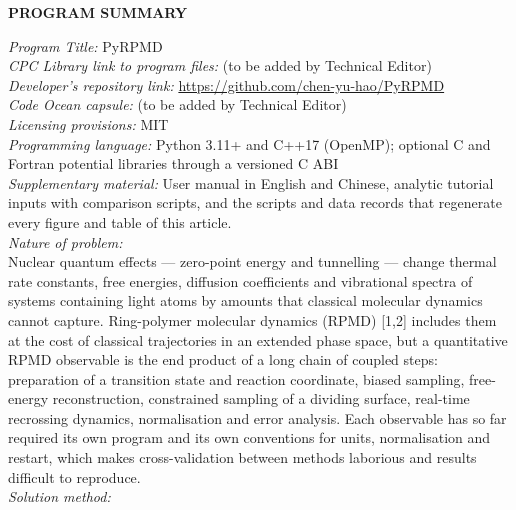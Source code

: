 \documentclass[preprint,12pt]{elsarticle}
\begin{document}
{\bf PROGRAM SUMMARY}

\begin{small}
\noindent
{\em Program Title:} PyRPMD \\
{\em CPC Library link to program files:} (to be added by Technical Editor) \\
{\em Developer's repository link:} \url{https://github.com/chen-yu-hao/PyRPMD} \\
{\em Code Ocean capsule:} (to be added by Technical Editor)\\
{\em Licensing provisions:} MIT \\
{\em Programming language:} Python 3.11+ and C++17 (OpenMP); optional C and Fortran potential libraries through a versioned C ABI \\
{\em Supplementary material:} User manual in English and Chinese, analytic tutorial inputs with comparison scripts, and the scripts and data records that regenerate every figure and table of this article. \\
{\em Nature of problem:}\\
Nuclear quantum effects --- zero-point energy and tunnelling --- change thermal rate constants, free energies, diffusion coefficients and vibrational spectra of systems containing light atoms by amounts that classical molecular dynamics cannot capture. Ring-polymer molecular dynamics (RPMD) [1,2] includes them at the cost of classical trajectories in an extended phase space, but a quantitative RPMD observable is the end product of a long chain of coupled steps: preparation of a transition state and reaction coordinate, biased sampling, free-energy reconstruction, constrained sampling of a dividing surface, real-time recrossing dynamics, normalisation and error analysis. Each observable has so far required its own program and its own conventions for units, normalisation and restart, which makes cross-validation between methods laborious and results difficult to reproduce. \\
{\em Solution method:}\\

\end{small}
\end{document}
